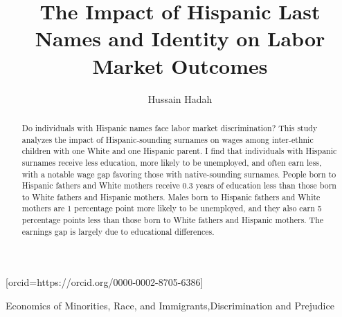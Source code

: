 \documentclass[a4paper,fleqn]{cas-sc}
\begin{document}
\let\WriteBookmarks\relax
\def\floatpagepagefraction{1}
\def\textpagefraction{.001}



\title [mode = title]{The Impact of Hispanic Last Names and Identity on Labor Market Outcomes}

\author[]{Hussain Hadah}[orcid=https://orcid.org/0000-0002-8705-6386]





\begin{abstract}
\singlespacing %
Do individuals with Hispanic names face labor market discrimination? This study analyzes the impact of Hispanic-sounding surnames on wages among inter-ethnic children with one White and one Hispanic parent. I find that individuals with Hispanic surnames receive less education, more likely to be unemployed, and often earn less, with a notable wage gap favoring those with native-sounding surnames. People born to Hispanic fathers and White mothers receive 0.3 years of education less than those born to White fathers and Hispanic mothers. Males born to Hispanic fathers and White mothers are 1 percentage point more likely to be unemployed, and they also earn 5 percentage points less than those born to White fathers and Hispanic mothers. The earnings gap is largely due to educational differences.
\end{abstract}

\begin{keywords}
\singlespacing %

 Economics of Minorities, Race, and Immigrants\sep Discrimination and Prejudice\\
\end{keywords}


\maketitle
\end{document}
